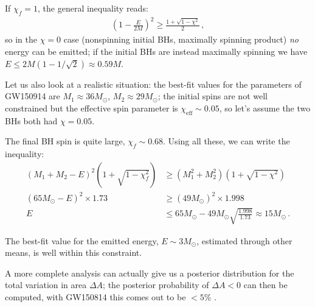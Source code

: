 \documentclass[main.tex]{subfiles}
\begin{document}
If \(\chi _f = 1\), the general inequality reads: 
%
\begin{align}
\left(1 - \frac{E}{2M}\right)^2 \geq \frac{1 + \sqrt{1 - \chi^2}}{2} 
\,,
\end{align}
%
so in the \(\chi = 0\) case (nonspinning initial BHs, maximally spinning product) \emph{no} energy can be emitted; if the initial BHs are instead maximally spinning we have \(E \leq 2M ( 1 - 1/\sqrt{2}) \approx 0.59 M\).

Let us also look at a realistic situation: the best-fit values for the parameters of GW150914 are \(M_1 \approx 36M_{\odot}\), \(M_2 \approx 29M_{\odot}\); the initial spins are not well constrained but the effective spin parameter is \(\chi _{\text{eff}} \sim 0.05\), so let's assume the two BHs both had \(\chi = 0.05\). 

The final BH spin is quite large, \(\chi _f \sim 0.68\). 
Using all these, we can write the inequality: %
\begin{align}
(M_1 + M_2 - E)^2 \left(1 + \sqrt{1 - \chi_f^2}\right) &\geq (M_1^2 + M_2^2 ) \left(1 + \sqrt{1 - \chi^2}\right)  \\
(65 M_{\odot} - E)^2 \times 1.73 &\geq (49 M_{\odot})^2 \times 1.998  \\
E &\leq 65M_{\odot} - 49 M_{\odot} \sqrt{\frac{1.998}{1.73}} \approx 15 M_{\odot}
\,.
\end{align}

The best-fit value for the emitted energy, \(E \sim 3M_{\odot}\), estimated through other means, is well within this constraint.

A more complete analysis can actually give us a posterior distribution for the total variation in area \(\Delta A\); the posterior probability of \(\Delta A < 0\) can then be computed, with GW150814 this comes out to be \(< 5\%\) \cite{isiTestingBlackholeArea2021}.
\end{document}
